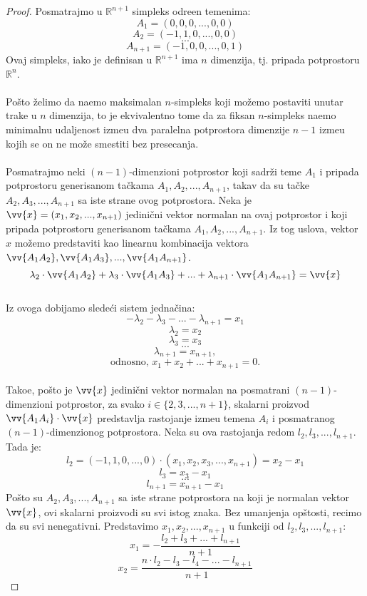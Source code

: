 \documentclass[11pt,letter]{article}
\begin{document}
\begin{proof}
Posmatrajmo u $\mathbb{R}^{n+1}$ simpleks odre\dj en temenima:
$$A_1=(0, 0, 0, ..., 0, 0)$$
$$A_2=(-1, 1, 0, ..., 0, 0)$$
$$...$$
$$A_{n+1}=(-1,0,0,..., 0, 1)$$
Ovaj simpleks, iako je definisan u $\mathbb{R}^{n+1}$ ima $n$ dimenzija, tj. pripada potprostoru $\mathbb{R}^n$. 
 \\
\\
\indent Po\v sto \v zelimo da na\dj emo maksimalan $n$-simpleks koji mo\v zemo postaviti unutar trake u $n$ dimenzija, to je ekvivalentno tome da za fiksan $n$-simpleks na\dj emo minimalnu udaljenost izme\dj u dva paralelna potprostora dimenzije $n-1$ izme\dj u kojih se on ne mo\v ze smestiti bez presecanja.
\\
\\
\indent Posmatrajmo neki $(n-1)$-dimenzioni potprostor koji sadr\v zi teme $A_1$ i pripada potprostoru generisanom ta\v ckama $A_1, A_2,..., A_{n+1}$, takav da su ta\v cke $A_2, A_3,..., A_{n+1}$ sa iste strane ovog potprostora. Neka je $\vv{x}=(x_1, x_2,..., x_{n+1})$ jedini\v cni vektor normalan na ovaj potprostor i koji pripada potprostoru generisanom ta\v ckama $A_1, A_2,..., A_{n+1}$. Iz tog uslova, vektor $x$ mo\v zemo predstaviti kao linearnu kombinacija vektora $\vv{A_1A_2}, \vv{A_1A_3},...,\vv{A_1 A_{n+1}}$.
\\
$$\lambda_2 \cdot \vv{A_1A_2}+\lambda_3 \cdot \vv{A_1A_3}+...+\lambda_{n+1}\cdot \vv{A_1A_{n+1}}=\vv{x}$$
\\
Iz ovoga dobijamo slede\' ci sistem jedna\v cina:
$$ -\lambda_2-\lambda_3-...-\lambda_{n+1}=x_1$$
$$\lambda_2=x_2$$
$$\lambda_3=x_3$$
$$...$$
$$\lambda_{n+1}=x_{n+1},$$
$$\text{odnosno, } x_1+x_2+...+x_{n+1}=0.$$
\\
Tako\dj e, po\v sto je $\vv{x}$ jedini\v cni vektor normalan na posmatrani $(n-1)$-dimenzioni potprostor, za svako $i\in \{2, 3,..., n+1\}$, skalarni proizvod $\vv{A_1A_i}\cdot \vv{x}$ predstavlja rastojanje izme\dj u temena $A_i$ i posmatranog $(n-1)$-dimenzionog potprostora. Neka su ova rastojanja redom $l_2, l_3,..., l_{n+1}$. Tada je:
$$l_2=(-1, 1, 0,..., 0)\cdot (x_1, x_2, x_3,..., x_{n+1})=x_2-x_1$$
$$l_3=x_3-x_1$$
$$...$$
$$l_{n+1}=x_{n+1}-x_1$$
Po\v sto su $A_2, A_3,..., A_{n+1}$ sa iste strane potprostora na koji je normalan vektor $\vv{x}$, ovi skalarni proizvodi su svi istog znaka. Bez umanjenja op\v stosti, recimo da su svi nenegativni.
Predstavimo $x_1, x_2,..., x_{n+1}$ u funkciji od $l_2, l_3,..., l_{n+1}$:
$$x_1=-\frac{l_2+l_3+...+l_{n+1}}{n+1}$$
$$x_2=\frac{n\cdot l_2-l_3-l_4-...-l_{n+1}}{n+1}$$

\end{proof}
\end{document}
